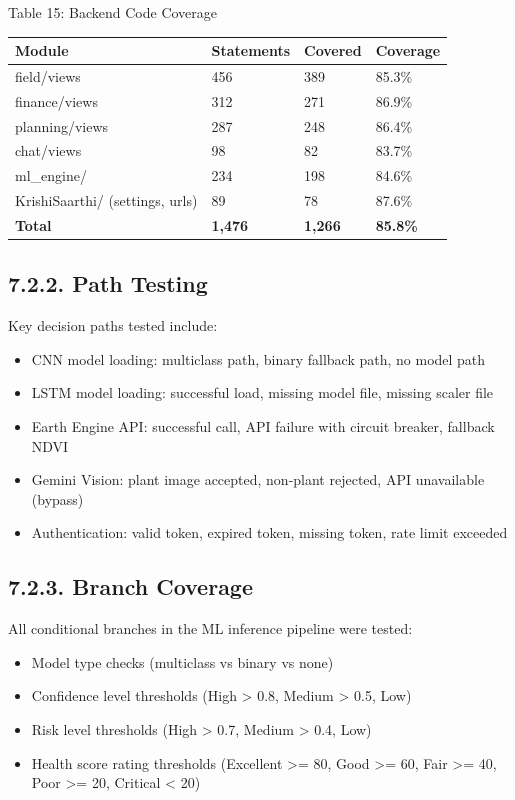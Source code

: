 \documentclass[12pt, a4paper]{report}
\begin{document}
Table 15: Backend Code Coverage

\begin{table}[htbp]
\centering
\small
\begin{tabularx}{\textwidth}{|X|X|X|X|}
\hline
Module & Statements & Covered & Coverage \\
\hline
field/views & 456 & 389 & 85.3\% \\
finance/views & 312 & 271 & 86.9\% \\
planning/views & 287 & 248 & 86.4\% \\
chat/views & 98 & 82 & 83.7\% \\
ml\_engine/ & 234 & 198 & 84.6\% \\
KrishiSaarthi/ (settings, urls) & 89 & 78 & 87.6\% \\
\textbf{Total} & \textbf{1,476} & \textbf{1,266} & \textbf{85.8\%} \\
\hline
\end{tabularx}
\end{table}

\subsection{7.2.2. Path Testing}
Key decision paths tested include:

\begin{itemize}[leftmargin=*]
  \item CNN model loading: multiclass path, binary fallback path, no model path
  \item LSTM model loading: successful load, missing model file, missing scaler file
  \item Earth Engine API: successful call, API failure with circuit breaker, fallback NDVI
  \item Gemini Vision: plant image accepted, non-plant rejected, API unavailable (bypass)
  \item Authentication: valid token, expired token, missing token, rate limit exceeded
\end{itemize}
\subsection{7.2.3. Branch Coverage}
All conditional branches in the ML inference pipeline were tested:

\begin{itemize}[leftmargin=*]
  \item Model type checks (multiclass vs binary vs none)
  \item Confidence level thresholds (High > 0.8, Medium > 0.5, Low)
  \item Risk level thresholds (High > 0.7, Medium > 0.4, Low)
  \item Health score rating thresholds (Excellent >= 80, Good >= 60, Fair >= 40, Poor >= 20, Critical < 20)
\end{itemize}
\end{document}
